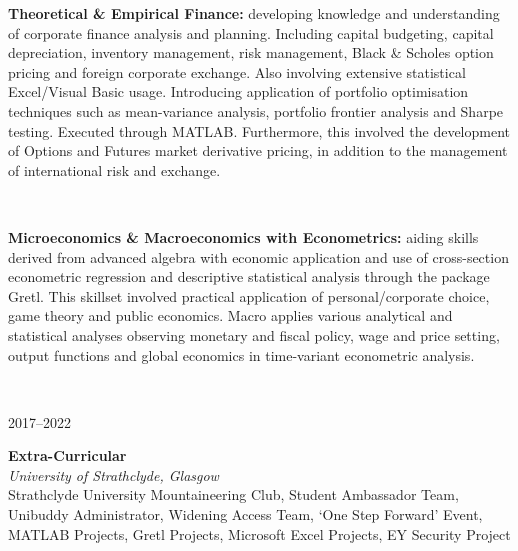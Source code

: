 \documentclass[11pt, english]{article}
\begin{document}
{\begin{minipage}[t]{.15\linewidth}
        \hfill 
        \textsc{}
\end{minipage}
\hfill\vline\hfill
\begin{minipage}[t]{.80\linewidth}
	\textbf{Theoretical \& Empirical Finance:} developing knowledge and understanding of corporate finance analysis and planning. Including capital budgeting, capital depreciation, inventory management, risk management, Black \& Scholes option pricing and foreign corporate exchange. Also involving extensive statistical Excel/Visual Basic usage. Introducing application of portfolio optimisation techniques such as mean-variance analysis, portfolio frontier analysis and Sharpe testing. Executed through MATLAB. Furthermore, this involved the development of Options and Futures market derivative pricing, in addition to the management of international risk and exchange.
\end{minipage}\\

\begin{minipage}[t]{.15\linewidth}
	\hfill 
        \textsc{}
\end{minipage}
\hfill\vline\hfill
\begin{minipage}[t]{.80\linewidth}
	\textbf{Microeconomics \& Macroeconomics with Econometrics:} aiding skills derived from advanced algebra with economic application and use of cross-section econometric regression and descriptive statistical analysis through the package Gretl. This skillset involved practical application of personal/corporate choice, game theory and public economics. Macro applies various analytical and statistical analyses observing monetary and fiscal policy, wage and price setting, output functions and global economics in time-variant econometric analysis.
\end{minipage}\\
\vspace{0.25cm} 

\begin{minipage}[t]{.15\linewidth}
        \hfill             
        \textsc{2017--2022}
\end{minipage}                    
\hfill\vline\hfill
\begin{minipage}[t]{.80\linewidth}
	\textbf{Extra-Curricular}\\            
        \textit{University of Strathclyde, Glasgow}\\
	Strathclyde University Mountaineering Club, Student Ambassador Team, Unibuddy Administrator, Widening Access Team, `One Step Forward' Event, MATLAB Projects, Gretl Projects, Microsoft Excel Projects, EY Security Project
\end{minipage}\\
\vspace{0.25cm}

}
\end{document}
